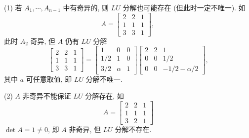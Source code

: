 \begin{tcolorbox}[breakable, title=补充说明]
    (1) 若 $A_{1}, \cdots, A_{n-1} $ 中有奇异的, 则 $LU$ 分解也可能存在 (但此时一定不唯一). 如
$$
A=\left[\begin{array}{lll}
2 & 2 & 1 \\
1 & 1 & 1 \\
3 & 3 & 1
\end{array}\right] \text {, }
$$
此时 $A_{2} $ 奇异, 但 $ A $ 仍有 $ {LU} $ 分解
$$
\left[\begin{array}{lll}
2 & 2 & 1 \\
1 & 1 & 1 \\
3 & 3 & 1
\end{array}\right]=\left[\begin{array}{ccc}
1 & 0 & 0 \\
1 / 2 & 1 & 0 \\
3 / 2 & \alpha & 1
\end{array}\right]\left[\begin{array}{ccc}
2 & 2 & 1 \\
0 & 0 & 1 / 2 \\
0 & 0 & -1 / 2-\alpha / 2
\end{array}\right],
$$
其中 $ a $ 可任意取值, 即 $LU$ 分解不唯一.

(2) $A$ 非奇异不能保证 $LU$ 分解存在, 如
$$
A=\left[\begin{array}{lll}
2 & 2 & 1 \\
1 & 1 & 1 \\
3 & 2 & 1
\end{array}\right]
$$
$ \operatorname{det} A=1 \neq 0 $, 即 $ A $ 非奇异, 但 $LU$ 分解不存在.
\end{tcolorbox}



